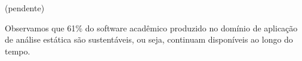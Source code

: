 {}
\label{conclusoes}

(pendente)


Observamos que 61\% do software acadêmico produzido no domínio de aplicação de análise estática
são sustentáveis, ou seja, continuam disponíveis ao longo do tempo.







